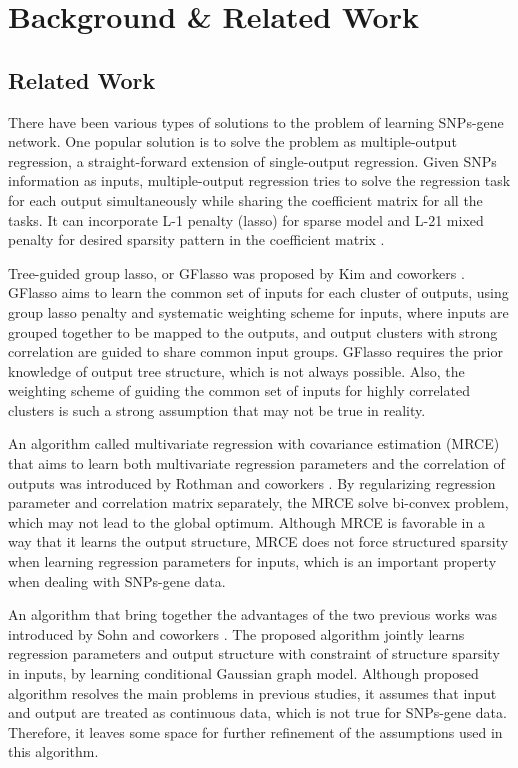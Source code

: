 \documentclass{article}
\begin{document}
\section{Background \& Related Work}
\label{LiteratureReview}


\subsection{Related Work}
There have been various types of solutions to the problem of learning SNPs-gene network. One popular solution is to solve the problem as multiple-output regression, a straight-forward extension of single-output regression. 
Given SNPs information as inputs, multiple-output regression tries to solve the regression task for each output simultaneously while sharing the coefficient matrix for all the tasks. It can incorporate L-1 penalty (lasso) for sparse model and L-21 mixed penalty for desired sparsity pattern in the coefficient matrix \cite{obozinski2008high}.




Tree-guided group lasso, or GFlasso was proposed by Kim and coworkers \cite{kim2010tree}.
GFlasso aims to learn the common set of inputs for each cluster of outputs, using group lasso penalty and systematic weighting scheme for inputs, where inputs are grouped together to be mapped to the outputs, and output clusters with strong correlation are guided to share common input groups.
GFlasso requires the prior knowledge of output tree structure, which is not always possible.
Also, the weighting scheme of guiding the common set of inputs for highly correlated clusters is such a strong assumption that may not be true in reality.


An algorithm called multivariate regression with covariance estimation (MRCE) that aims to learn both multivariate regression parameters and the correlation of outputs was introduced by Rothman and coworkers \cite{rothman2010sparse}.
By regularizing regression parameter and correlation matrix separately, the MRCE solve bi-convex problem, which may not lead to the global optimum. Although MRCE is favorable in a way that it learns the output structure, MRCE does not force structured sparsity when learning regression parameters for inputs, which is an important property when dealing with SNPs-gene data.


An algorithm that bring together the advantages of the two previous works \cite{kim2010tree} \cite{rothman2010sparse} was introduced by Sohn and coworkers \cite{sohn2012joint}. 
The proposed algorithm jointly learns regression parameters and output structure with constraint of structure sparsity in inputs, by learning conditional Gaussian graph model.
Although proposed algorithm resolves the main problems in previous studies, it assumes that input and output are treated as continuous data, which is not true for SNPs-gene data.
Therefore, it leaves some space for further refinement of the assumptions used in this algorithm.
\end{document}
